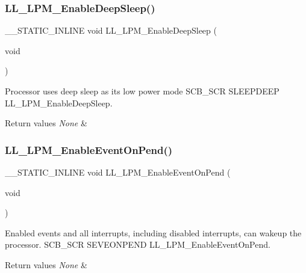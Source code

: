 \subsubsection{\texorpdfstring{L\+L\+\_\+\+L\+P\+M\+\_\+\+Enable\+Deep\+Sleep()}{LL\_LPM\_EnableDeepSleep()}}
{\footnotesize\ttfamily \+\_\+\+\_\+\+S\+T\+A\+T\+I\+C\+\_\+\+I\+N\+L\+I\+NE void L\+L\+\_\+\+L\+P\+M\+\_\+\+Enable\+Deep\+Sleep (\begin{DoxyParamCaption}\item[{void}]{ }\end{DoxyParamCaption})}



Processor uses deep sleep as its low power mode  S\+C\+B\+\_\+\+S\+CR S\+L\+E\+E\+P\+D\+E\+EP L\+L\+\_\+\+L\+P\+M\+\_\+\+Enable\+Deep\+Sleep. 


\begin{DoxyRetVals}{Return values}
{\em None} & \\
\hline
\end{DoxyRetVals}
\mbox{\label{group___c_o_r_t_e_x___l_l___e_f___l_o_w___p_o_w_e_r___m_o_d_e_gaf1c01ae00b4a13c5b6531f82a9677b90}} 
\subsubsection{\texorpdfstring{L\+L\+\_\+\+L\+P\+M\+\_\+\+Enable\+Event\+On\+Pend()}{LL\_LPM\_EnableEventOnPend()}}
{\footnotesize\ttfamily \+\_\+\+\_\+\+S\+T\+A\+T\+I\+C\+\_\+\+I\+N\+L\+I\+NE void L\+L\+\_\+\+L\+P\+M\+\_\+\+Enable\+Event\+On\+Pend (\begin{DoxyParamCaption}\item[{void}]{ }\end{DoxyParamCaption})}



Enabled events and all interrupts, including disabled interrupts, can wakeup the processor.  S\+C\+B\+\_\+\+S\+CR S\+E\+V\+E\+O\+N\+P\+E\+ND L\+L\+\_\+\+L\+P\+M\+\_\+\+Enable\+Event\+On\+Pend. 


\begin{DoxyRetVals}{Return values}
{\em None} & \\
\hline
\end{DoxyRetVals}
\mbox{\label{group___c_o_r_t_e_x___l_l___e_f___l_o_w___p_o_w_e_r___m_o_d_e_gab55eabc37e5abe00df558c0ba1c37508}} 
